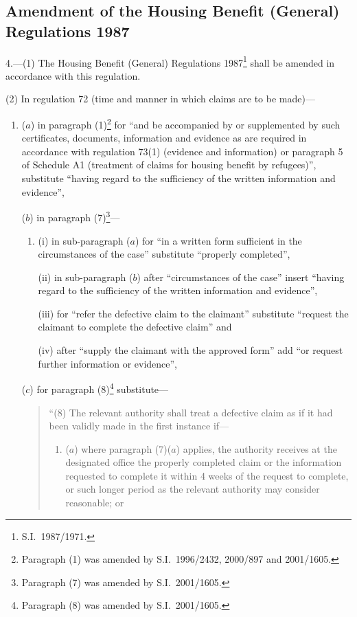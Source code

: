 \documentclass[12pt,a4paper]{article}
\begin{document}

\subsection[4. Amendment of the Housing Benefit (General) Regulations 1987]{\sloppy Amendment of the Housing Benefit (General) Regulations 1987}

4.---(1)  The Housing Benefit (General) Regulations 1987\footnote{S.I.\ 1987/1971.} shall be amended in accordance with this regulation.

(2) In regulation 72 (time and manner in which claims are to be made)—
\begin{enumerate}\item[]
($a$) in paragraph (1)\footnote{Paragraph (1) was amended by S.I.\ 1996/2432, 2000/897 and 2001/1605.} for “and be accompanied by or supplemented by such certificates, documents, information and evidence as are required in accordance with regulation 73(1) (evidence and information) or paragraph 5 of Schedule A1 (treatment of claims for housing benefit by refugees)”, substitute “having regard to the sufficiency of the written information and evidence”,

($b$) in paragraph (7)\footnote{Paragraph (7) was amended by S.I.\ 2001/1605.}—
\begin{enumerate}\item[]
(i) in sub-paragraph ($a$)  for “in a written form sufficient in the circumstances of the case” substitute “properly completed”,

(ii) in sub-paragraph ($b$)  after “circumstances of the case” insert “having regard to the sufficiency of the written information and evidence”,

(iii) for “refer the defective claim to the claimant” substitute “request the claimant to complete the defective claim” and

(iv) after “supply the claimant with the approved form” add “or request further information or evidence”,
\end{enumerate}

($c$) for paragraph (8)\footnote{Paragraph (8) was amended by S.I.\ 2001/1605.} substitute—
\begin{quotation}
“(8) The relevant authority shall treat a defective claim as if it had been validly made in the first instance if—
\begin{enumerate}\item[]
($a$) where paragraph (7)($a$)  applies, the authority receives at the designated office the properly completed claim or the information requested to complete it within 4 weeks of the request to complete, or such longer period as the relevant authority may consider reasonable; or


\end{enumerate}
\end{quotation}
\end{enumerate}
\end{document}
